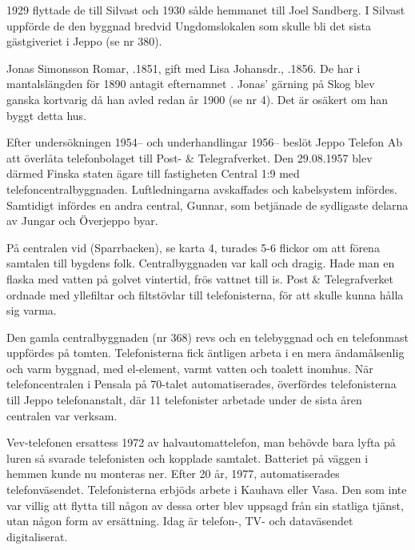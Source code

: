 1929 flyttade de till Silvast och 1930 sålde hemmanet till Joel Sandberg. I Silvast uppförde de den byggnad bredvid Ungdomslokalen som skulle bli det sista gästgiveriet i Jeppo (se nr 380).


Jonas Simonsson Romar, .1851, gift med Lisa Johansdr., .1856. De har i mantalslängden för 1890 antagit efternamnet . Jonas' gärning på Skog blev ganska kortvarig då han avled redan år 1900 (se nr 4). Det är osäkert om han byggt detta hus.






Efter undersökningen 1954-- och underhandlingar 1956-- beslöt	Jeppo Telefon Ab att överlåta telefonbolaget till Post- \& Telegrafverket. Den 29.08.1957 blev därmed Finska staten ägare till fastigheten Central 1:9 med telefoncentralbyggnaden. Luftledningarna avskaffades och kabelsystem infördes. Samtidigt infördes en andra central, Gunnar, som betjänade de sydligaste delarna av Jungar och Överjeppo byar.

På centralen vid  (Sparrbacken), se karta 4, turades 5-6 flickor om att förena samtalen till bygdens folk. Centralbyggnaden var kall och dragig. Hade man en flaska med vatten på golvet vintertid, frös vattnet till is. Post \& Telegrafverket ordnade med yllefiltar och filtstövlar till telefonisterna, för att skulle kunna hålla sig varma.

Den gamla centralbyggnaden (nr 368) revs och en telebyggnad och en telefonmast uppfördes på tomten. Telefonisterna fick äntligen arbeta i en mera ändamålsenlig och varm byggnad, med el-element, varmt vatten och toalett inomhus. När telefoncentralen i Pensala på 70-talet automatiserades, överfördes telefonisterna till Jeppo telefonanstalt, där 11 telefonister arbetade under de sista åren centralen var verksam.

Vev-telefonen ersattess 1972 av halvautomattelefon, man behövde bara lyfta på luren så svarade telefonisten och kopplade samtalet. Batteriet på väggen i hemmen kunde nu monteras ner. Efter 20 år, 1977, automatiserades telefonväsendet. Telefonisterna erbjöds arbete i Kauhava eller Vasa. Den som inte var villig att flytta till någon av dessa orter blev uppsagd från sin statliga tjänst, utan någon form av ersättning. Idag är telefon-, TV- och dataväsendet digitaliserat.


